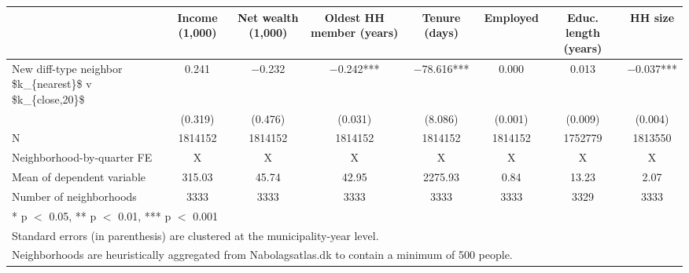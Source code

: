 \begin{tabular}[t]{lccccccc}
\toprule
  & Income (1,000) & Net wealth (1,000) & Oldest HH member (years) & Tenure (days) & Employed & Educ. length (years) & HH size\\
\midrule
New diff-type neighbor \$k\_\{nearest\}\$ v \$k\_\{close,20\}\$ & \num{0.241} & \num{-0.232} & \num{-0.242}*** & \num{-78.616}*** & \num{0.000} & \num{0.013} & \num{-0.037}***\\
 & (\num{0.319}) & (\num{0.476}) & (\num{0.031}) & (\num{8.086}) & (\num{0.001}) & (\num{0.009}) & (\num{0.004})\\
\midrule
N & 1814152 & 1814152 & 1814152 & 1814152 & 1814152 & 1752779 & 1813550\\
Neighborhood-by-quarter FE & X & X & X & X & X & X & X\\
Mean of dependent variable & 315.03 & 45.74 & 42.95 & 2275.93 & 0.84 & 13.23 & 2.07\\
Number of neighborhoods & 3333 & 3333 & 3333 & 3333 & 3333 & 3329 & 3333\\
\bottomrule
\multicolumn{8}{l}{\rule{0pt}{1em}* p $<$ 0.05, ** p $<$ 0.01, *** p $<$ 0.001}\\
\multicolumn{8}{l}{\rule{0pt}{1em}Standard errors (in parenthesis) are clustered at the municipality-year level.}\\
\multicolumn{8}{l}{\rule{0pt}{1em}Neighborhoods are heuristically aggregated from Nabolagsatlas.dk to contain a minimum of 500 people.}\\
\end{tabular}